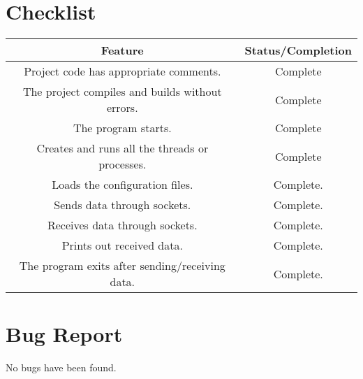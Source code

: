 \documentclass{article}
\begin{document}

\section{Checklist}

\begin{tabular}{|c|c|}
\hline
Feature & Status/Completion\\
\hline \hline
Project code has appropriate comments. & Complete\\
\hline
The project compiles and builds without errors. & Complete\\
\hline
The program starts. & Complete\\
\hline
Creates and runs all the threads or processes. & Complete\\
\hline
Loads the configuration files. & Complete.\\
\hline
Sends data through sockets. & Complete.\\
\hline
Receives data through sockets. & Complete.\\
\hline
Prints out received data. & Complete.\\
\hline
The program exits after sending/receiving data. & Complete.\\
\hline
\end{tabular}

\section{Bug Report}
No bugs have been found.
\end{document}
